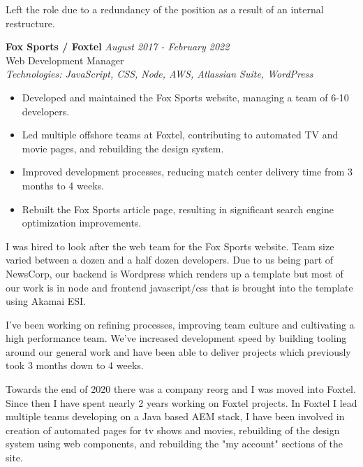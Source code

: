 \documentclass[a4paper,10pt]{article}
\begin{document}
Left the role due to a redundancy of the position as a result of an internal restructure.

\vspace{1em}

\textbf{Fox Sports / Foxtel} \hfill \textit{August 2017 - February 2022} \\
Web Development Manager \\
\textit{Technologies: JavaScript, CSS, Node, AWS, Atlassian Suite, WordPress}
\begin{itemize}
    \item Developed and maintained the Fox Sports website, managing a team of 6-10 developers.
    \item Led multiple offshore teams at Foxtel, contributing to automated TV and movie pages, and rebuilding the design system.
    \item Improved development processes, reducing match center delivery time from 3 months to 4 weeks.
    \item Rebuilt the Fox Sports article page, resulting in significant search engine optimization improvements.
\end{itemize}

I was hired to look after the web team for the Fox Sports website. Team size varied between a dozen and a half dozen developers. Due to us being part of NewsCorp, our backend is Wordpress which renders up a template but most of our work is in node and frontend javascript/css that is brought into the template using Akamai ESI.

I've been working on refining processes, improving team culture and cultivating a high performance team. We've increased development speed by building tooling around our general work and have been able to deliver projects which previously took 3 months down to 4 weeks.

Towards the end of 2020 there was a company reorg and I was moved into Foxtel. Since then I have spent nearly 2 years working on Foxtel projects. In Foxtel I lead multiple teams developing on a Java based AEM stack, I have been involved in creation of automated pages for tv shows and movies, rebuilding of the design system using web components, and rebuilding the "my account" sections of the site.

\vspace{1em}
\end{document}
